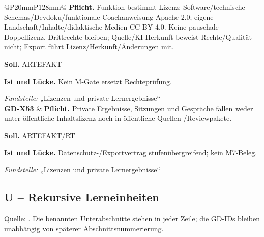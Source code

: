 \begin{longtable}{@{}P{20mm}P{128mm}@{}}
\textbf{Pflicht.} Funktion bestimmt Lizenz: Software/technische Schemas/Devdoku/funktionale Coachanweisung Apache-2.0; eigene Landschaft/Inhalte/didaktische Medien CC-BY-4.0. Keine pauschale Doppellizenz. Drittrechte bleiben; Quelle/KI-Herkunft beweist Rechte/Qualität nicht; Export führt Lizenz/Herkunft/Änderungen mit.\par\smallskip
\textbf{Soll.} ARTEFAKT\par\smallskip
\textbf{Ist und Lücke.} Kein M-Gate ersetzt Rechteprüfung.\par\smallskip
\emph{Fundstelle:} „Lizenzen und private Lernergebnisse“\\\addlinespace[5pt]
\label{rule:GD-X53}\textbf{GD-X53} &
\textbf{Pflicht.} Private Ergebnisse, Sitzungen und Gespräche fallen weder unter öffentliche Inhaltslizenz noch in öffentliche Quellen-/Reviewpakete.\par\smallskip
\textbf{Soll.} ARTEFAKT/RT\par\smallskip
\textbf{Ist und Lücke.} Datenschutz-/Exportvertrag stufenübergreifend; kein M7-Beleg.\par\smallskip
\emph{Fundstelle:} „Lizenzen und private Lernergebnisse“\\\addlinespace[5pt]
\bottomrule
\end{longtable}
\endgroup

\subsection{U -- Rekursive Lerneinheiten}
Quelle: . Die benannten Unterabschnitte stehen in jeder Zeile; die GD-IDs bleiben unabhängig von späterer Abschnittsnummerierung.

